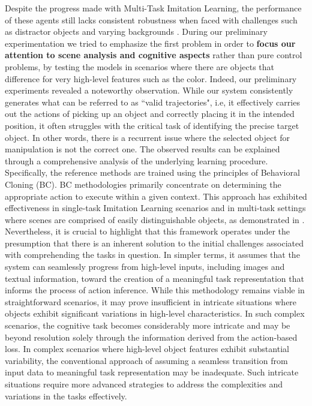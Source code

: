 Despite the progress made with Multi-Task Imitation Learning, the performance of these agents still lacks consistent robustness when faced with challenges such as distractor objects and varying backgrounds \cite{brohan2022rt}. During our preliminary experimentation we tried to emphasize the first problem in order to \textbf{focus our attention to scene analysis and cognitive aspects} rather than pure control problems, by testing the models in scenarios where there are objects that difference for very high-level features such as the color. Indeed, our preliminary experiments revealed a noteworthy observation. While our system consistently generates what can be referred to as ``valid trajectories", i.e, it effectively carries out the actions of picking up an object and correctly placing it in the intended position, it often struggles with the critical task of identifying the precise target object. In other words, there is a recurrent issue where the selected object for manipulation is not the correct one.
\newline The observed results can be explained through a comprehensive analysis of the underlying learning procedure. Specifically, the reference methods \cite{dasari2021transformers_one_shot,mandi2022towards_more_generalizable_one_shot,brohan2022rt} are trained using the principles of Behavioral Cloning (BC). BC methodologies primarily concentrate on determining the appropriate action to execute within a given context. This approach has exhibited effectiveness in single-task Imitation Learning scenarios \cite{zhang2018deep_vr_teleoperation,duan2017one_shot_il} and in multi-task settings where scenes are comprised of easily distinguishable objects, as demonstrated in \cite{dasari2021transformers_one_shot,mandi2022towards_more_generalizable_one_shot,brohan2022rt}. Nevertheless, it is crucial to highlight that this framework operates under the presumption that there is an inherent solution to the initial challenges associated with comprehending the tasks in question. In simpler terms, it assumes that the system can seamlessly progress from high-level inputs, including images and textual information, toward the creation of a meaningful task representation that informs the process of action inference. While this methodology remains viable in straightforward scenarios, it may prove insufficient in intricate situations where objects exhibit significant variations in high-level characteristics. In such complex scenarios, the cognitive task becomes considerably more intricate and may be beyond resolution solely through the information derived from the action-based loss. In complex scenarios where high-level object features exhibit substantial variability, the conventional approach of assuming a seamless transition from input data to meaningful task representation may be inadequate. Such intricate situations require more advanced strategies to address the complexities and variations in the tasks effectively.
